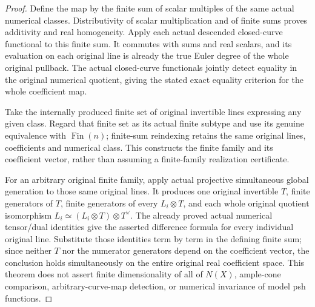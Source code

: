 \begin{proof}
Define the map by the finite sum of scalar multiples of the same
actual numerical classes. Distributivity of scalar multiplication
and of finite sums proves additivity and real homogeneity. Apply
each actual descended closed-curve functional to this finite sum.
It commutes with sums and real scalars, and its evaluation on each
original line is already the true Euler degree of the whole
original pullback. The actual closed-curve functionals jointly
detect equality in the original numerical quotient, giving the
stated exact equality criterion for the whole coefficient map.

Take the internally produced finite set of original invertible
lines expressing any given class. Regard that finite set as its
actual finite subtype and use its genuine equivalence with
$\operatorname{Fin}(n)$; finite-sum reindexing retains the same
original lines, coefficients and numerical class. This constructs
the finite family and its coefficient vector, rather than
assuming a finite-family realization certificate.

For an arbitrary original finite family, apply actual projective
simultaneous global generation to those same original lines. It
produces one original invertible $T$, finite generators of $T$,
finite generators of every $L_i\otimes T$, and each whole original
quotient isomorphism
$L_i\simeq(L_i\otimes T)\otimes T^\vee$.
The already proved actual numerical tensor/dual identities give
the asserted difference formula for every individual original
line. Substitute those identities term by term in the defining
finite sum; since neither $T$ nor the numerator generators depend
on the coefficient vector, the conclusion holds simultaneously
on the entire original real coefficient space. This theorem does
not assert finite dimensionality of all of $N(X)$, ample-cone
comparison, arbitrary-curve-map detection, or numerical invariance
of model psh functions.
\end{proof}
